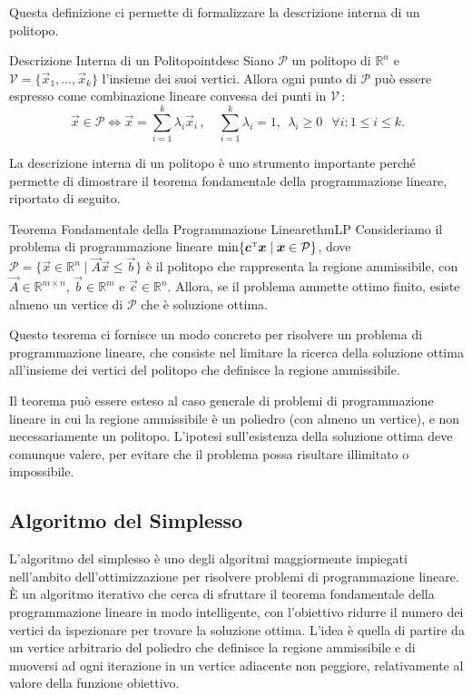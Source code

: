Questa definizione ci permette di formalizzare la descrizione interna di un politopo.

\begin{thmbox}{Descrizione Interna di un Politopo}{intdesc}
    Siano \( \mathcal{P} \) un politopo di \( \mathbb{R}^n \) e \( \mathcal{V} = \{\vec{x}_1, \ldots, \vec{x}_k\} \)
    l'insieme dei suoi vertici. Allora ogni punto di \( \mathcal{P} \) può essere espresso come combinazione lineare
    convessa dei punti in \( \mathcal{V} \,\):
    \[
        \vec{x} \in \mathcal{P} \iff \vec{x} = \sum_{i=1}^k \lambda_i \vec{x}_i\,,\quad  \sum_{i=1}^k \lambda_i =
        1,\;\, \lambda_i \geq 0 \;\;\, \forall i\colon 1 \leq i \leq k.
    \]
\end{thmbox}
La descrizione interna di un politopo è uno strumento importante perché permette di dimostrare il teorema fondamentale
della programmazione lineare, riportato di seguito.

\begin{thmbox}{Teorema Fondamentale della Programmazione Lineare}{thmLP}
    Consideriamo il problema di programmazione lineare \( \min\{\bm{c}^{\scriptscriptstyle\mathrm{T}}\bm{x} \mid \bm{x} \in \mathcal{P}\} \),
    dove \( \mathcal{P} = \{\vec{x} \in \mathbb{R}^n \mid \vec{A}\vec{x} \leq \vec{b}\} \) è il politopo che rappresenta
    la regione ammissibile, con \( \vec{A} \in \mathbb{R}^{m\times n}, \, \vec{b} \in \mathbb{R}^m \) e \( \vec{c} \in
    \mathbb{R}^n \). Allora, se il problema ammette ottimo finito, esiste almeno un vertice di \( \mathcal{P} \) che è
    soluzione ottima.
\end{thmbox}

Questo teorema ci fornisce un modo concreto per risolvere un problema di programmazione lineare, che consiste nel limitare
la ricerca della soluzione ottima all'insieme dei vertici del politopo che definisce la regione ammissibile.

Il teorema può essere esteso al caso generale di problemi di programmazione lineare in cui la regione ammissibile è un
poliedro (con almeno un vertice), e non necessariamente un politopo. L'ipotesi sull'esistenza della soluzione ottima
deve comunque valere, per evitare che il problema possa risultare illimitato o impossibile.

\subsection{Algoritmo del Simplesso}
L'algoritmo del simplesso è uno degli algoritmi maggiormente impiegati nell'ambito dell'ottimizzazione per risolvere
problemi di programmazione lineare. \`E un algoritmo iterativo che cerca di sfruttare il teorema fondamentale della
programmazione lineare in modo intelligente, con l'obiettivo ridurre il numero dei vertici da ispezionare per trovare la
soluzione ottima. L'idea è quella di partire da un vertice arbitrario del poliedro che definisce la regione ammissibile
e di muoversi ad ogni iterazione in un vertice adiacente non peggiore, relativamente al valore della funzione obiettivo.

